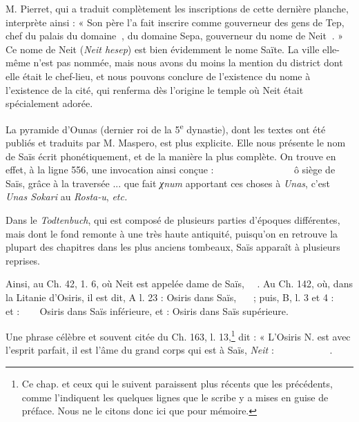 \documentclass[a4paper, 11pt, oneside]{article}
\newcommand*\hieroAAAD{}
\newcommand*\hieroAAAF{}
\newcommand*\hieroAAAG{}
\newcommand*\hieroAAAH{}
\newcommand*\hieroAAAI{}
\newcommand*\hieroAAAQ{}
\newcommand*\hieroAAAW{\raisebox{0.5ex}{}}
\newcommand*\hieroAABC{\raisebox{0.5ex}{}}
\newcommand*\hieroAABG{}
\newcommand*\hieroAABR{}
\newcommand*\hieroAABU{}
\newcommand*\hieroAABV{}
\newcommand*\hieroAABW{}
\newcommand*\hieroAABX{}
\newcommand*\hieroAABY{\raisebox{0.5ex}{}}
\newcommand*\hieroAABZ{}
\newcommand*\hieroAACA{}
\newcommand*\hieroAACB{\raisebox{0.5ex}{}}
\newcommand*\hieroAACC{}
\newcommand*\hieroAACD{}
\newcommand*\hieroAACE{}
\newcommand*\hieroAACF{}
\newcommand*\hieroAACG{}
\newcommand*\hieroAACH{}
\newcommand*\hieroAACI{}
\newcommand*\hieroAACJ{}
\newcommand*\hieroAACK{}
\newcommand*\hieroAACL{\raisebox{0.5ex}{}}
\newcommand*\hieroAACM{}
\newcommand*\hieroAACN{\raisebox{1ex}{}}
\newcommand*\hieroAACO{}
\newcommand*\hieroAACP{}
\newcommand*\hieroAACQ{}
\newcommand*\hieroAACR{}
\newcommand*\hieroAACS{}
\newcommand*\hieroAACT{}
\newcommand*\hieroAACU{}
\newcommand*\hieroAACV{}
\newcommand*\hieroAACW{}
\newcommand*\hieroAACX{}
\newcommand*\hieroAACY{}
\newcommand*\hieroAACZ{}
\newcommand*\hieroAADA{}
\newcommand*\hieroAADB{}
\newcommand*\hieroAADC{\raisebox{0.5ex}{}}
\newcommand*\hieroAADD{}
\newcommand*\hieroAADE{}
\newcommand*\hieroAADF{}
\newcommand*\hieroAADG{}
\newcommand*\hieroAADH{}
\newcommand*\hieroAADI{\raisebox{0.5ex}{}}
\newcommand*\hieroAADJ{}
\newcommand*\hieroAADK{}
\newcommand*\hieroAADL{}
\newcommand*\hieroAADM{}
\newcommand*\hieroAADN{}
\newcommand*\hieroAADO{}
\newcommand*\hieroAADP{}
\newcommand*\hieroAADQ{}
\newcommand*\hieroAADR{}
\begin{document}
M. Pierret, qui a traduit complètement les inscriptions de cette dernière planche, interprète ainsi : « Son père l'a fait inscrire comme gouverneur des gens de Tep, chef du palais du domaine $\hieroAABU\:\hieroAABV$, du domaine Sepa, gouverneur du nome de Neit $\hieroAABG\:\hieroAABW$. » Ce nome de Neit (\emph{Neit hesep}) est bien évidemment le nome Saïte. La ville elle-même n'est pas nommée, mais nous avons du moins la mention du district dont elle était le chef-lieu, et nous pouvons conclure de l'existence du nome à l'existence de la cité, qui renferma dès l'origine le temple où Neit était spécialement adorée.

La pyramide d'Ounas (dernier roi de la 5\textsuperscript{e} dynastie), dont les textes ont été publiés et traduits par M. Maspero, est plus explicite. Elle nous présente le nom de Saïs écrit phonétiquement, et de la manière la plus complète. On trouve en effet, à la ligne 556, une invocation ainsi conçue : $\hieroAABX\:\hieroAABY\:\hieroAABZ\:\hieroAAAI\allowbreak\:\hieroAACA\:\hieroAACB\:\hieroAAAW\:\hieroAABR\:\hieroAACC\allowbreak\:\hieroAACD\:\hieroAAAH\:\hieroAACE\:\hieroAAAH\allowbreak\:\hieroAAAH\:\hieroAACF\:\hieroAACB\:\hieroAACG\allowbreak\:\hieroAACH\:\hieroAACI\:\hieroAAAH\:\hieroAACJ\allowbreak\:\hieroAACK\:\hieroAACL\:\hieroAACM\:\hieroAACN\:\hieroAACO\allowbreak\:\hieroAACO\:\hieroAACP\:\hieroAACQ\:\hieroAACN\allowbreak\:\hieroAAAH\:\hieroAACR\:\hieroAACS\:\hieroAACT\:\hieroAACU$ ô siège de Saïs, grâce à la traversée ... que fait \emph{χnum} apportant ces choses à \emph{Unas}, c'est \emph{Unas Sokari} au \emph{Rosta-u}, \emph{etc.}

Dans le \emph{Todtenbuch}, qui est composé de plusieurs parties d'époques différentes, mais dont le fond remonte à une très haute antiquité, puisqu'on en retrouve la plupart des chapitres dans les plus anciens tombeaux, Saïs apparaît à plusieurs reprises.

Ainsi, au Ch. 42, 1. 6, où Neit est appelée dame de Saïs, $\hieroAACV\:\hieroAABC\:\hieroAACW\:\hieroAACX\:\hieroAACY$. Au Ch. 142, où, dans la Litanie d'Osiris, il est dit, A l. 23 : Osiris dans Saïs, $\hieroAACZ\:\hieroAADA\:\hieroAAAI\allowbreak\:\hieroAAAG\:\hieroAAAF\:\hieroAADB$ ; puis, B, l. 3 et 4 : $\hieroAACZ\:\hieroAADA\:\hieroAAAI\allowbreak\:\hieroAADC\:\hieroAAAW\:\hieroAADD\:\hieroAADB$ et : $\hieroAACZ\:\hieroAABR\:\hieroAAAD\:\hieroAADC\:\hieroAAAW\:\hieroAADE\:\hieroAADB$ Osiris dans Saïs inférieure, et : Osiris dans Saïs supérieure.

Une phrase célèbre et souvent citée du Ch. 163, l. 13,\footnote{Ce chap. et ceux qui le suivent paraissent plus récents que les précédents, comme l'indiquent les quelques lignes que le scribe y a mises en guise de préface. Nous ne le citons donc ici que pour mémoire.} dit : « L'Osiris N. est avec l'esprit parfait, il est l'âme du grand corps qui est à Saïs, \emph{Neit} : $\hieroAAAH\:\hieroAADF\:\hieroAACR\:\hieroAADG\allowbreak\:\hieroAADH\:\hieroAADI\:\hieroAADB\:\hieroAAAH\allowbreak\:\hieroAADJ\:\hieroAADK\:\hieroAADL\:\hieroAADM\allowbreak\:\hieroAADN\:\hieroAACN\:\hieroAADO\allowbreak\:\hieroAADP\:\hieroAADQ\:\hieroAADR\:\hieroAABR\allowbreak\:\hieroAAAD\:\hieroAAAG\:\hieroAADC\:\hieroAAAW\allowbreak\:\hieroAAAQ\:\hieroAACY$.
\end{document}
